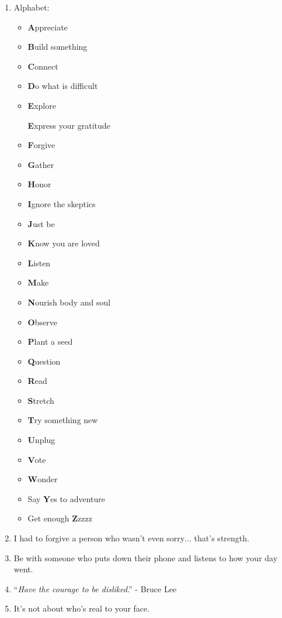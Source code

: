 \documentclass{article}
\numberwithin{equation}{section}
\begin{document}
\begin{enumerate}
    Time means nothing, character does.
    \item Alphabet:
    \begin{itemize}
        \item \textbf{A}ppreciate
        \item \textbf{B}uild something
        \item \textbf{C}onnect
        \item \textbf{D}o what is difficult
        \item \textbf{E}xplore
        
        \textbf{E}xpress your gratitude
        \item \textbf{F}orgive
        \item \textbf{G}ather
        \item \textbf{H}onor
        \item \textbf{I}gnore the skeptics
        \item \textbf{J}ust be
        \item \textbf{K}now you are loved
        \item \textbf{L}isten
        \item \textbf{M}ake
        \item \textbf{N}ourish body and soul
        \item \textbf{O}bserve
        \item \textbf{P}lant a seed
        \item \textbf{Q}uestion
        \item \textbf{R}ead
        \item \textbf{S}tretch
        \item \textbf{T}ry something new
        \item \textbf{U}nplug
        \item \textbf{V}ote
        \item \textbf{W}onder
        \item Say \textbf{Y}es to adventure
        \item Get enough \textbf{Z}zzzz
    \end{itemize}
    \item I had to forgive a person who wasn't even sorry$\ldots$ that's strength.
    \item Be with someone who puts down their phone and listens to how your day went.
    \item ``\textit{Have the courage to be disliked}.'' - Bruce Lee
    \item It's not about who's real to your face.
    

\end{enumerate}
\end{document}
